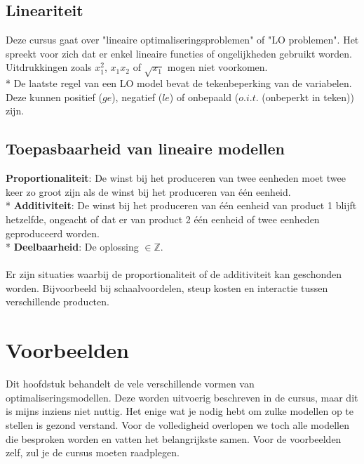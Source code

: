 \documentclass[10pt]{article}
\begin{document}
\subsection{Lineariteit}
Deze cursus gaat over "lineaire optimaliseringsproblemen" of "LO problemen". Het spreekt voor zich dat er enkel lineaire functies of ongelijkheden gebruikt worden. Uitdrukkingen zoals $x_1^2$, $x_1x_2$ of $\sqrt{x_1}$ mogen niet voorkomen.\\*
De laatste regel van een LO model bevat de tekenbeperking van de variabelen. Deze kunnen positief ($ge$), negatief ($le$) of onbepaald ($o.i.t.$ (onbeperkt in teken)) zijn.
\subsection{Toepasbaarheid van lineaire modellen}
\textbf{Proportionaliteit}: De winst bij het produceren van twee eenheden moet twee keer zo groot zijn als de winst bij het produceren van \'e\'en eenheid.\\*
\textbf{Additiviteit}: De winst bij het produceren van \'e\'en eenheid van product 1 blijft hetzelfde, ongeacht of dat er van product 2 \'e\'en eenheid of twee eenheden geproduceerd worden.\\*
\textbf{Deelbaarheid}: De oplossing $\in \mathbb{Z}$.\\\\
Er zijn situaties waarbij de proportionaliteit of de additiviteit kan geschonden worden. Bijvoorbeeld bij schaalvoordelen, steup kosten en interactie tussen verschillende producten.
\section{Voorbeelden}
Dit hoofdstuk behandelt de vele verschillende vormen van optimaliseringsmodellen. Deze worden uitvoerig beschreven in de cursus, maar dit is mijns inziens niet nuttig. Het enige wat je nodig hebt om zulke modellen op te stellen is gezond verstand. Voor de volledigheid overlopen we toch alle modellen die besproken worden en vatten het belangrijkste samen. Voor de voorbeelden zelf, zul je de cursus moeten raadplegen.
\end{document}
